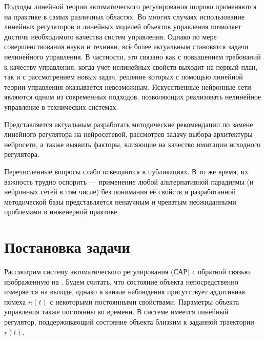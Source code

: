 
Подходы линейной теории автоматического регулирования широко
применяются на практике в самых различных областях.  Во многих случаях
использование линейных регуляторов и линейных моделей объектов
управления позволяет достичь необходимого качества систем управления.
Однако по мере совершенствования науки и техники, всё более актуальным
становятся задачи нелинейного управления.  В частности, это связано
как с повышением требований к качеству управления, когда учет
нелинейных свойств выходит на первый план, так и с рассмотрением новых
задач, решение которых с помощью линейной теории управления
оказывается невозможным.  Искусственные нейронные сети являются одним
из современных подходов, позволяющих реализовать нелинейное управление
в технических системах.


Представляется актуальным разработать методические рекомендации по
замене линейного регулятора на нейросетевой, рассмотрев задачу выбора
архитектуры нейросети, а также выявить факторы, влияющие на качество
имитации исходного регулятора.


Перечисленные вопросы слабо освещаются в публикациях.  В то же время,
их важность трудно оспорить --- применение любой альтернативной
парадигмы (и нейронных сетей в том числе) без понимания её свойств и
разработанной методической базы представляется ненаучным и чреватым
неожиданными проблемами в инженерной практике.

\section{Постановка задачи}

Рассмотрим систему автоматического регулирования (САР) с обратной
связью, изображенную на .  Будем считать, что
состояние объекта непосредственно измеряется на выходе, однако в
канале наблюдения присутствует аддитивная помеха $n(t)$ с некоторыми
постоянными свойствами.  Параметры объекта управления также постоянны
во времени.  В системе имеется линейный регулятор, поддерживающий
состояние объекта близким к заданной траектории $r(t)$.

